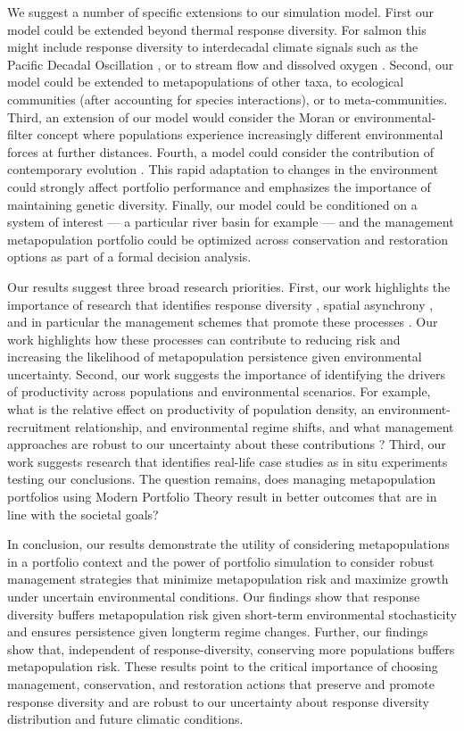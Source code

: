 We suggest a number of specific extensions to our simulation model. First our model could be extended beyond thermal response diversity. For salmon this might include response diversity to interdecadal climate signals such as the Pacific Decadal Oscillation \citep{mantua2002}, or to stream flow and dissolved oxygen \citep{priede1988}. Second, our model could be extended to metapopulations of other taxa, to ecological communities (after accounting for species interactions), or to meta-communities. Third, an extension of our model would consider the Moran or environmental-filter concept \citep{schindler2008, rogers2008} where populations experience increasingly different environmental forces at further distances. Fourth, a model could consider the contribution of contemporary evolution \citep{stockwell2003}. This rapid adaptation to changes in the environment could strongly affect portfolio performance and emphasizes the importance of maintaining genetic diversity. Finally, our model could be conditioned on a system of interest --- a particular river basin for example --- and the management metapopulation portfolio could be optimized across conservation and restoration options as part of a formal decision analysis.

Our results suggest three broad research priorities. First, our work highlights the importance of research that identifies response diversity \citep[e.g.][]{eliason2011}, spatial asynchrony \citep[e.g.][]{thorson2013}, and in particular the management schemes that promote these processes \citep{moore2010}. Our work highlights how these processes can contribute to reducing risk and increasing the likelihood of metapopulation persistence given environmental uncertainty. Second, our work suggests the importance of identifying the drivers of productivity across populations and environmental scenarios. For example, what is the relative effect on productivity of population density, an environment-recruitment relationship, and environmental regime shifts, and what management approaches are robust to our uncertainty about these contributions \citep{vert-pre2013}? Third, our work suggests research that identifies real-life case studies as in situ experiments testing our conclusions. The question remains, does managing metapopulation portfolios using Modern Portfolio Theory result in better outcomes that are in line with the societal goals?

In conclusion, our results demonstrate the utility of considering metapopulations in a portfolio context and the power of portfolio simulation to consider robust management strategies that minimize metapopulation risk and maximize growth under uncertain environmental conditions. Our findings show that response diversity buffers metapopulation risk given short-term environmental stochasticity and ensures persistence given longterm regime changes. Further, our findings show that, independent of response-diversity, conserving more populations buffers metapopulation risk. These results point to the critical importance of choosing management, conservation, and restoration actions that preserve and promote response diversity and are robust to our uncertainty about response diversity distribution and future climatic conditions.

